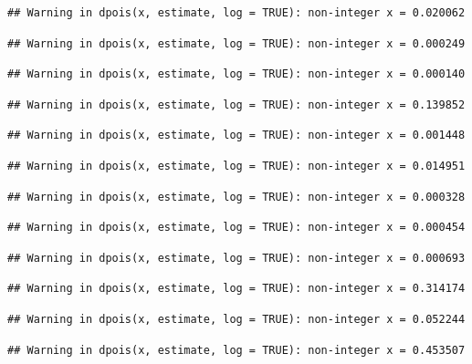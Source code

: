 \documentclass[]{article}
\begin{document}
\begin{verbatim}
## Warning in dpois(x, estimate, log = TRUE): non-integer x = 0.020062
\end{verbatim}

\begin{verbatim}
## Warning in dpois(x, estimate, log = TRUE): non-integer x = 0.000249
\end{verbatim}

\begin{verbatim}
## Warning in dpois(x, estimate, log = TRUE): non-integer x = 0.000140
\end{verbatim}

\begin{verbatim}
## Warning in dpois(x, estimate, log = TRUE): non-integer x = 0.139852
\end{verbatim}

\begin{verbatim}
## Warning in dpois(x, estimate, log = TRUE): non-integer x = 0.001448
\end{verbatim}

\begin{verbatim}
## Warning in dpois(x, estimate, log = TRUE): non-integer x = 0.014951
\end{verbatim}

\begin{verbatim}
## Warning in dpois(x, estimate, log = TRUE): non-integer x = 0.000328
\end{verbatim}

\begin{verbatim}
## Warning in dpois(x, estimate, log = TRUE): non-integer x = 0.000454
\end{verbatim}

\begin{verbatim}
## Warning in dpois(x, estimate, log = TRUE): non-integer x = 0.000693
\end{verbatim}

\begin{verbatim}
## Warning in dpois(x, estimate, log = TRUE): non-integer x = 0.314174
\end{verbatim}

\begin{verbatim}
## Warning in dpois(x, estimate, log = TRUE): non-integer x = 0.052244
\end{verbatim}

\begin{verbatim}
## Warning in dpois(x, estimate, log = TRUE): non-integer x = 0.453507
\end{verbatim}
\end{document}
